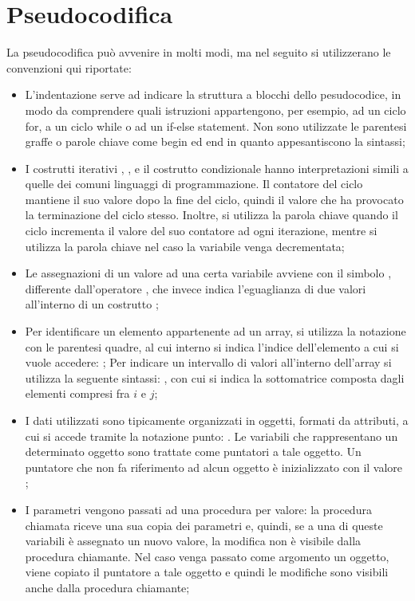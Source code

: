 \section{Pseudocodifica}
La pseudocodifica può avvenire in molti modi, ma nel seguito si utilizzerano le convenzioni qui riportate:
\begin{itemize}
  \item L'indentazione serve ad indicare la struttura a blocchi dello pesudocodice, in modo da comprendere quali istruzioni appartengono, per esempio, ad un ciclo for, a un ciclo while o ad un if-else statement. Non sono utilizzate le parentesi graffe o parole chiave come begin ed end in quanto appesantiscono la sintassi;
  \item I costrutti iterativi , ,  e il costrutto condizionale  hanno interpretazioni simili a quelle dei comuni linguaggi di programmazione. Il contatore del ciclo mantiene il suo valore dopo la fine del ciclo, quindi il valore che ha provocato la terminazione del ciclo stesso. Inoltre, si utilizza la parola chiave  quando il ciclo  incrementa il valore del suo contatore ad ogni iterazione, mentre si utilizza la parola chiave  nel caso la variabile venga decrementata;
  \item Le assegnazioni di un valore ad una certa variabile avviene con il simbolo \code{:=}, differente dall'operatore \code{=}, che invece indica l'eguaglianza di due valori all'interno di un costrutto ;
  \item Per identificare un elemento appartenente ad un array, si utilizza la notazione con le parentesi quadre, al cui interno si indica l'indice dell'elemento a cui si vuole accedere: ; Per indicare un intervallo di valori all'interno dell'array si utilizza la seguente sintassi: , con cui si indica la sottomatrice composta dagli elementi compresi fra \(i\) e \(j\); 
  \item I dati utilizzati sono tipicamente organizzati in oggetti, formati da attributi, a cui si accede tramite la notazione punto: . Le variabili che rappresentano un determinato oggetto sono trattate come puntatori a tale oggetto. Un puntatore che non fa riferimento ad alcun oggetto è inizializzato con il valore ;
  \item I parametri vengono passati ad una procedura per valore: la procedura chiamata riceve una sua copia dei parametri e, quindi, se a una di queste variabili è assegnato un nuovo valore, la modifica non è visibile dalla procedura chiamante. Nel caso venga passato come argomento un oggetto, viene copiato il puntatore a tale oggetto e quindi le modifiche sono visibili anche dalla procedura chiamante;

\end{itemize}

